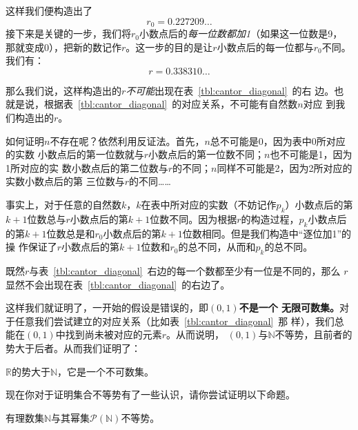 这样我们便构造出了
\[
    r_{0}=0.227209\ldots 
\]
接下来是关键的一步，我们将$r_{0}$小数点后的\emph{每一位数都加1}（如果这一位数是9，
那就变成0），把新的数记作$r$。这一步的目的是让$r$小数点后的每一位都与$r_{0}$不同。
我们有：
\[
    r=0.338310\ldots 
\]

那么我们说，这样构造出的$r$\emph{不可能}出现在表~\ref{tbl:cantor_diagonal}~的右
边。也就是说，根据表~\ref{tbl:cantor_diagonal}~的对应关系，不可能有自然数$n$对应
到我们构造出的$r$。

如何证明$n$不存在呢？依然利用反证法。首先，$n$总不可能是0，因为表中0所对应的实数
小数点后的第一位数就与$r$小数点后的第一位数不同；$n$也不可能是1，因为1所对应的实
数小数点后的第二位数与$r$的不同；$n$同样不可能是2，因为2所对应的实数小数点后的第
三位数与$r$的不同……

事实上，对于任意的自然数$k$，$k$在表中所对应的实数（不妨记作$p_k$）小数点后的第
$k+1$位数总与$r$小数点后的第$k+1$位数不同。因为根据$r$的构造过程，$p_k$小数点后
的第$k+1$位数总是和$r_{0}$小数点后的第$k+1$位数相同。但是我们构造中“逐位加1”的操
作保证了$r$小数点后的第$k+1$位数和$r_{0}$的总不同，从而和$p_k$的总不同。

既然$r$与表~\ref{tbl:cantor_diagonal}~右边的每一个数都至少有一位是不同的，那么
$r$显然不会出现在表~\ref{tbl:cantor_diagonal}~的右边了。

这样我们就证明了，一开始的假设是错误的，即\textbf{$\left( 0,1 \right) $不是一个
无限可数集。}对于任意我们尝试建立的对应关系（比如表~\ref{tbl:cantor_diagonal}~那
样），我们总能在$\left( 0,1 \right) $中找到尚未被对应的元素$r$。从而说明，
$\left( 0,1 \right) $与$\mathbb{N}$不等势，且前者的势大于后者。从而我们证明了：

\begin{rawthm}
    $\mathbb{R}$的势大于$\mathbb{N}$，它是一个不可数集。
\end{rawthm}

现在你对于证明集合不等势有了一些认识，请你尝试证明以下命题。

\begin{rawprp}[2024台州二模19题改]
    有理数集$\mathbb{N}$与其幂集$\mathcal{P}(\mathbb{N})$不等势。    
\end{rawprp}


